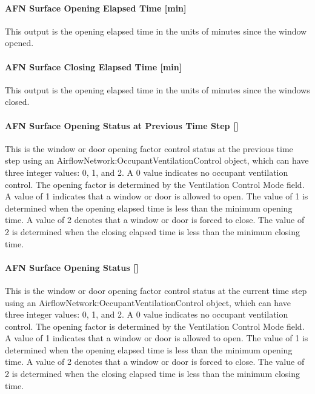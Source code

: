 \paragraph{AFN Surface Opening Elapsed Time {[}min{]}}\label{afn-surface-opening-elapsed-time-min}

This output is the opening elapsed time in the units of minutes since the window opened.

\paragraph{AFN Surface Closing Elapsed Time {[}min{]}}\label{afn-surface-closing-elapsed-time-min}

This output is the opening elapsed time in the units of minutes since the windows closed.

\paragraph{AFN Surface Opening Status at Previous Time Step {[]}}\label{afn-surface-opening-status-at-previous-time-step}

This is the window or door opening factor control status at the previous time step using an AirflowNetwork:OccupantVentilationControl object, which can have three integer values: 0, 1, and 2. A 0 value indicates no occupant ventilation control. The opening factor is determined by the Ventilation Control Mode field. A value of 1 indicates that a window or door is allowed to open. The value of 1 is determined when the opening elapsed time is less than the minimum opening time. A value of 2 denotes that a window or door is forced to close. The value of 2 is determined when the closing elapsed time is less than the minimum closing time.

\paragraph{AFN Surface Opening Status {[]}}\label{afn-surface-opening-status}

This is the window or door opening factor control status at the current time step using an AirflowNetwork:OccupantVentilationControl object, which can have three integer values: 0, 1, and 2. A 0 value indicates no occupant ventilation control. The opening factor is determined by the Ventilation Control Mode field. A value of 1 indicates that a window or door is allowed to open. The value of 1 is determined when the opening elapsed time is less than the minimum opening time. A value of 2 denotes that a window or door is forced to close. The value of 2 is determined when the closing elapsed time is less than the minimum closing time.

